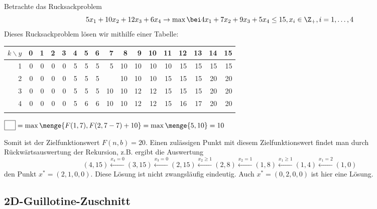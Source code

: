 \begin{beispiel}
	Betrachte das Rucksackproblem 
	\begin{equation*}
		5x_1 + 10x_2 + 12x_3 + 6x_4 \to \max \bei 4x_1 + 7x_2 + 9x_3 + 5x_4 \le 15, x_i \in \Z_+, i=1, \dots, 4
	\end{equation*}
	Dieses Rucksackproblem lösen wir mithilfe einer Tabelle: 
	\begin{center}
		\begin{tabular}{r|rrrrrrrrrrrrrrrr}
			$k \backslash y$ & 0     & 1     & 2     & 3     & 4     & 5     & 6     & 7     & 8     & 9     & 10    & 11    & 12    & 13    & 14    & 15 \\ \hline
			1     & 0     & 0     & 0     & 0     & 5     & 5     & 5     & 5     & 10    & 10    & 10    & 10    & 15    & 15    & 15    & 15 \\
			2     & 0     & 0     & 0     & 0     & 5     & 5     & 5     & \fbox{10}    & 10    & 10    & 10    & 15    & 15    & 15    & 20    & 20 \\
			3     & 0     & 0     & 0     & 0     & 5     & 5     & 5     & 10    & 10    & 12    & 12    & 15    & 15    & 15    & 20    & 20 \\
			4     & 0     & 0     & 0     & 0     & 5     & 6     & 6     & 10    & 10    & 12    & 12    & 15    & 16    & 17    & 20    & 20 \\
			&       &       &       &       &       &       &       &       &       &       &       &       &       &       &       &  
		\end{tabular}
	\end{center}	
	$\fbox{\phantom{M}}= \max\menge{F(1,7), F(2,7-7) + 10} = \max\menge{5,10} = 10$
	
	Somit ist der Zielfunktionswert $F(n,b) = 20$. 	
	Einen zulässigen Punkt mit diesem Zielfunktionswert findet man durch Rückwärtsauswertung der Rekursion, z.B. ergibt die Auswertung
	\begin{equation*}
	(4,15) \overset{x_4 = 0}{\longleftarrow} (3,15) \overset{x_3 = 0}{\longleftarrow} (2,15) \overset{x_2 \ge 1}{\longleftarrow} (2,8) \overset{x_2 = 1}{\longleftarrow} (1,8) \overset{x_1 \ge 1}{\longleftarrow} (1,4) \overset{x_1 = 2}{\longleftarrow} (1,0)
	\end{equation*}
	den Punkt $x^\ast = (2,1,0,0)$. 
	Diese Lösung ist nicht zwangsläufig eindeutig. Auch $x^\ast = (0,2,0,0)$ ist hier eine Lösung.
\end{beispiel}

\subsection{2D-Guillotine-Zuschnitt}

